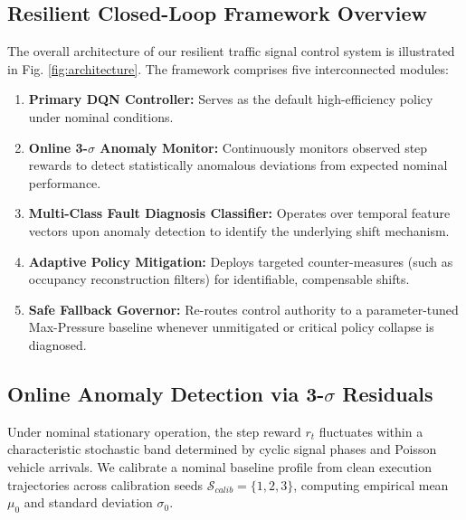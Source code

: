 \documentclass{ieeeaccess}
\begin{document}
\subsection{Resilient Closed-Loop Framework Overview}
The overall architecture of our resilient traffic signal control system is illustrated in Fig. \ref{fig:architecture}. The framework comprises five interconnected modules:
\begin{enumerate}
    \item \textbf{Primary DQN Controller:} Serves as the default high-efficiency policy under nominal conditions.
    \item \textbf{Online 3-$\sigma$ Anomaly Monitor:} Continuously monitors observed step rewards to detect statistically anomalous deviations from expected nominal performance.
    \item \textbf{Multi-Class Fault Diagnosis Classifier:} Operates over temporal feature vectors upon anomaly detection to identify the underlying shift mechanism.
    \item \textbf{Adaptive Policy Mitigation:} Deploys targeted counter-measures (such as occupancy reconstruction filters) for identifiable, compensable shifts.
    \item \textbf{Safe Fallback Governor:} Re-routes control authority to a parameter-tuned Max-Pressure baseline whenever unmitigated or critical policy collapse is diagnosed.
\end{enumerate}

\subsection{Online Anomaly Detection via 3-$\sigma$ Residuals}
Under nominal stationary operation, the step reward $r_t$ fluctuates within a characteristic stochastic band determined by cyclic signal phases and Poisson vehicle arrivals. We calibrate a nominal baseline profile from clean execution trajectories across calibration seeds $\mathcal{S}_{calib} = \{1, 2, 3\}$, computing empirical mean $\mu_0$ and standard deviation $\sigma_0$.
\end{document}
